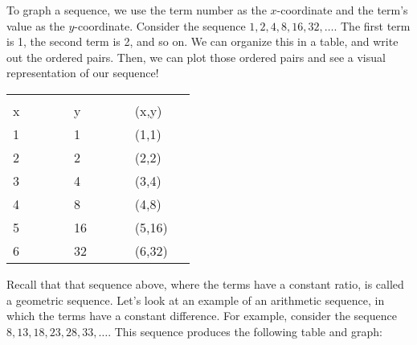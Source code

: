 To graph a sequence, we use the term number as the $x$-coordinate and the term's value as the $y$-coordinate. Consider the sequence $1, 2, 4, 8, 16, 32,\dotsc$. The first term is 1, the second term is 2, and so on. We can organize this in a table, and write out the ordered pairs. Then, we can plot those ordered pairs and see a visual representation of our sequence!


\bigskip
\begin{minipage}[c]{0.5\textwidth }
	\centering
	\begin{tabular}{|C{0.25\linewidth}|C{0.25\linewidth}|C{0.25\linewidth}|}
	\hline
	 &  & \\
	x & y & (x,y)\\ & 1 & (1,1)\\
	2 & 2 & (2,2)\\
	3 & 4 & (3,4)\\
	4 & 8 & (4,8)\\
	5 & 16 & (5,16)\\
	6 & 32 & (6,32)\\\hline
	\end{tabular}
\end{minipage}%
%
\begin{minipage}[c]{0.5\textwidth }
	\centering
\end{minipage}
\medskip

Recall that that sequence above, where the terms have a constant ratio, is called a geometric sequence. Let's look at an example of an arithmetic sequence, in which the terms have a constant difference. For example, consider the sequence $8, 13, 18, 23, 28, 33,\dotsc$. This sequence produces the following table and graph:


